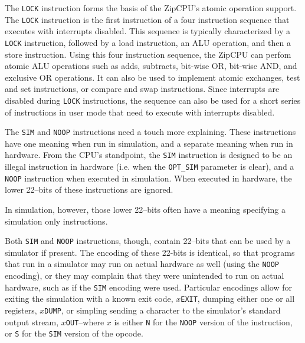 \documentclass{gqtekspec}
\begin{document}
The {\tt LOCK} instruction forms the basis of the ZipCPU's atomic operation
support.  The {\tt LOCK} instruction is the first instruction of a four
instruction sequence that executes with interrupts disabled.  This sequence is
typically characterized by a {\tt LOCK} instruction, followed by a load
instruction, an ALU operation, and then a store instruction.  Using this four
instruction sequence, the
ZipCPU can perfom atomic ALU operations such as adds, subtracts, bit-wise
OR, bit-wise AND, and exclusive OR operations.  It can also be used to
implement atomic exchanges, test and set instructions, or compare and swap
instructions.  Since interrupts are disabled during {\tt LOCK} instructions,
the sequence can also be used for a short series of instructions in user mode
that need to execute with interrupts disabled.

The {\tt SIM} and {\tt NOOP} instructions need a touch more explaining.
These instructions have one meaning when run in simulation, and a separate
meaning when run in hardware.  From the CPU's standpoint, the {\tt SIM}
instruction is designed to be an illegal instruction in hardware (i.e. when the
{\tt OPT\_SIM} parameter is clear), and a {\tt NOOP} instruction when executed
in simulation.  When executed in hardware, the lower 22--bits of these
instructions are ignored.

In simulation, however, those lower 22--bits often have a meaning specifying
a simulation only instructions.

Both {\tt SIM} and {\tt NOOP} instructions, though, contain 22--bits that can
be used by a simulator if present.  The encoding of these 22-bits is identical,
so that programs that run in a simulator may run on actual hardware as well
(using the {\tt NOOP} encoding), or they may complain that they were unintended
to run on actual hardware, such as if the {\tt SIM} encoding were used.
Particular encodings allow for exiting the simulation with a known exit
code, {\tt $x$EXIT}, dumping either one or all registers, {\tt $x$DUMP}, 
or simpling sending a character to the simulator's standard output stream,
{\tt $x$OUT}--where $x$ is either {\tt N} for the {\tt NOOP} version of the
instruction, or {\tt S} for the {\tt SIM} version of the opcode.
\end{document}
